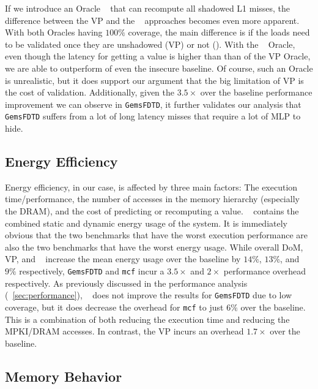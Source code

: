 If we introduce an Oracle \recomp~ that can recompute all shadowed L1 misses, the difference between the VP and the \recomp~ approaches becomes even more apparent. With both Oracles having $100\%$ coverage, the main difference is if the loads need to be validated once they are unshadowed (VP) or not (\recomp). 
With the \recomp~ Oracle, even though the latency for getting a value is higher than than of the VP Oracle, we are able to outperform of even the insecure baseline. Of course, such an Oracle is unrealistic, but it does support our argument that the big limitation of VP is the cost of validation. Additionally, given the $3.5\times$ over the baseline performance improvement we can observe in \texttt{GemsFDTD}, it further validates our analysis that \texttt{GemsFDTD} suffers from a lot of long latency misses that require a lot of MLP to hide.

\subsection{Energy Efficiency}
\label{sec:energy}

Energy efficiency, in our case, is affected by three main factors: The execution time/performance, the number of accesses in the memory hierarchy (especially the DRAM), and the cost of predicting or recomputing a value.
~ contains the combined static and dynamic energy usage of the system. It is immediately obvious that the two benchmarks that have the worst execution performance are also the two benchmarks that have the worst energy usage. While overall DoM, VP, and \recomp~ increase the mean energy usage over the baseline by $14\%$, $13\%$, and $9\%$ respectively, \texttt{GemsFDTD} and \texttt{mcf} incur a $3.5\times$ and $2\times$ performance overhead respectively. As previously discussed in the performance analysis (~\autoref{sec:performance}), \recomp~ does not improve the results for \texttt{GemsFDTD} due to low coverage, but it does decrease the overhead for \texttt{mcf} to just $6\%$ over the baseline. This is a combination of both reducing the execution time and reducing the MPKI/DRAM accesses. In contrast, the VP incurs an overhead $1.7\times$ over the baseline.

\subsection{Memory Behavior}
\label{sec:memory}